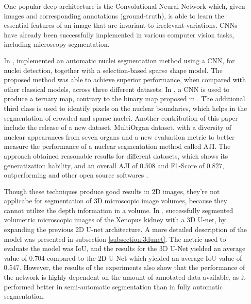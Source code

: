 One popular deep architecture is the Convolutional Neural Network which, given images and corresponding annotations (ground-truth), is able to learn the essential features of an image that are invariant to irrelevant variations. \ac{CNNs} have already been successfully implemented in various computer vision tasks, including microscopy segmentation.

In \cite{CNN2}, \citeauthor{CNN2} implemented an automatic nuclei segmentation method using a \ac{CNN}, for nuclei detection, together with a selection-based sparse shape model. The proposed method was able to achieve superior performance, when compared with other classical models, across three different datasets. In \cite{CNN3}, a \ac{CNN} is used to produce a ternary map, contrary to the binary map proposed in \cite{CNN2}. The additional third class is used to identify pixels on the nuclear boundaries, which helps in the segmentation of crowded and sparse nuclei. Another contribution of this paper include the release of a new dataset, MultiOrgan dataset, with a diversity of nuclear appearances from seven organs and a new evaluation metric to better measure the performance of a nuclear segmentation method called \ac{AJI}. The approach obtained reasonable results for different datasets, which shows its generatization hability, and an overall \ac{AJI} of 0.508 and F1-Score of  0.827, outperforming \cite{CNN2} and other open source softwares \cite{cellprofiler}. 

Though these techniques produce good results in \ac{2D} images, they're not applicabe for segmentation of \ac{3D} microscopic image volumes, because they cannot utilize the depth information in a volume. In \cite{Unet:3D}, \citeauthor{Unet:3D} successfully segmented volumetric microscopic images of the Xenopus kidney with a \ac{3D} U-net, by expanding the previous \ac{2D} U-net \cite{Unet:2D} architecture. A more detailed description of the model was presented in subsection \ref{subsection:3dunet}. The metric used to evaluate the model was \ac{IoU}, and the results for the \ac{3D} U-Net yielded an average value of 0.704 compared to the \ac{2D} U-Net which yielded an average \ac{IoU} value of 0.547. However, the results of the experiments also show that the performance of the network is highly dependent on the amount of annotated data available, as it performed better in semi-automatic segmentation than in fully automatic segmentation.


